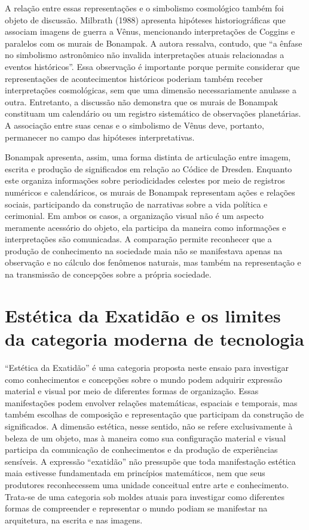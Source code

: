 \documentclass[11pt, a4paper]{article}
\begin{document}
A relação entre essas representações e o simbolismo cosmológico também foi objeto de discussão. Milbrath (1988) apresenta hipóteses historiográficas que associam imagens de guerra a Vênus, mencionando interpretações de Coggins e paralelos com os murais de Bonampak. A autora ressalva, contudo, que “a ênfase no simbolismo astronômico não invalida interpretações atuais relacionadas a eventos históricos”. Essa observação é importante porque permite considerar que representações de acontecimentos históricos poderiam também receber interpretações cosmológicas, sem que uma dimensão necessariamente anulasse a outra. Entretanto, a discussão não demonstra que os murais de Bonampak constituam um calendário ou um registro sistemático de observações planetárias. A associação entre suas cenas e o simbolismo de Vênus deve, portanto, permanecer no campo das hipóteses interpretativas.

Bonampak apresenta, assim, uma forma distinta de articulação entre imagem, escrita e produção de significados em relação ao Códice de Dresden. Enquanto este organiza informações sobre periodicidades celestes por meio de registros numéricos e calendáricos, os murais de Bonampak representam ações e relações sociais, participando da construção de narrativas sobre a vida política e cerimonial. Em ambos os casos, a organização visual não é um aspecto meramente acessório do objeto, ela participa da maneira como informações e interpretações são comunicadas. A comparação permite reconhecer que a produção de conhecimento na sociedade maia não se manifestava apenas na observação e no cálculo dos fenômenos naturais, mas também na representação e na transmissão de concepções sobre a própria sociedade.

\section{ Estética da Exatidão e os limites da categoria moderna de tecnologia}

“Estética da Exatidão” é uma categoria proposta neste ensaio para investigar como conhecimentos e concepções sobre o mundo podem adquirir expressão material e visual por meio de diferentes formas de organização. Essas manifestações podem envolver relações matemáticas, espaciais e temporais, mas também escolhas de composição e representação que participam da construção de significados. A dimensão estética, nesse sentido, não se refere exclusivamente à beleza de um objeto, mas à maneira como sua configuração material e visual participa da comunicação de conhecimentos e da produção de experiências sensíveis. A expressão “exatidão” não pressupõe que toda manifestação estética maia estivesse fundamentada em princípios matemáticos, nem que seus produtores reconhecessem uma unidade conceitual entre arte e conhecimento. Trata-se de uma categoria sob moldes atuais para investigar como diferentes formas de compreender e representar o mundo podiam se manifestar na arquitetura, na escrita e nas imagens.
\end{document}
